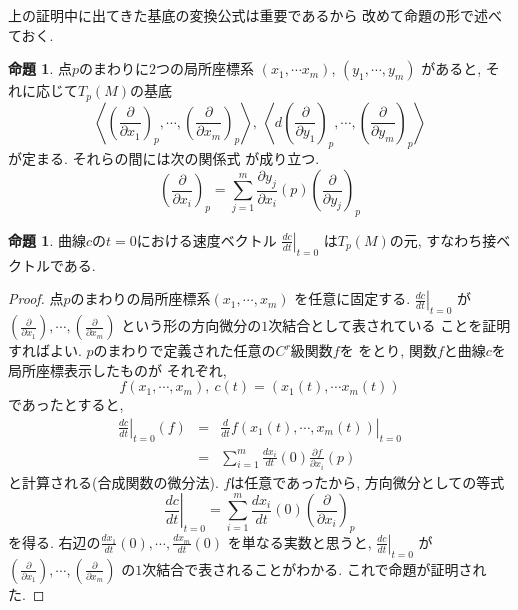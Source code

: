 \documentclass[a4j,12pt]{jarticle}
\theoremstyle{definition}
\newtheorem{proposition}[theorem]{命題}
\begin{document}
    上の証明中に出てきた基底の変換公式は重要であるから
    改めて命題の形で述べておく. 
    \begin{proposition}\label{prop:basis conversion}
        点$p$のまわりに$2$つの局所座標系
        $(x_1,\cdots x_m)$, $(y_1,\cdots ,y_m)$
        があると, それに応じて$T_p(M)$の基底
        $$\left<\left(\frac{\partial}
        {\partial x_1}\right)_p,\cdots ,
        \left(\frac{\partial}
        {\partial x_m}\right)_p\right>,\ 
        \left<d\left(\frac{\partial}
        {\partial y_1}\right)_p,\cdots ,
        \left(\frac{\partial}
        {\partial y_m}\right)_p\right>$$
        が定まる. それらの間には次の関係式
        が成り立つ. 
        $$\left(\frac{\partial}{\partial x_i}\right)_p=
        \sum_{j=1}^{m}
        \frac{\partial y_j}{\partial x_i}(p)
        \left(\frac{\partial}{\partial y_j}\right)_p$$
    \end{proposition}
    \begin{proposition}
        曲線$c$の$t=0$における速度ベクトル
        $\left .\frac{dc}{dt}\right|_{t=0}$
        は$T_p(M)$の元, すなわち接ベクトルである. 
    \end{proposition}
    \begin{proof}
        点$p$のまわりの局所座標系$(x_1,\cdots ,x_m)$
        を任意に固定する. 
        $\left .\frac{dc}{dt}\right|_{t=0}$
        が$\left(\frac{\partial}{\partial x_1}\right), 
        \cdots ,
        \left(\frac{\partial}{\partial x_m}\right)$
        という形の方向微分の$1$次結合として表されている
        ことを証明すればよい. 
        $p$のまわりで定義された任意の$C^r$級関数$f$を
        をとり, 関数$f$と曲線$c$を局所座標表示したものが
        それぞれ, 
        $$f(x_1,\cdots ,x_m),\ 
        c(t)=(x_1(t),\cdots x_m(t))$$
        であったとすると, 
        \begin{eqnarray*}
            \left .\frac{dc}{dt}\right|_{t=0}(f)&=&
            \left .\frac{d}{dt}f(x_1(t),\cdots ,x_m(t))
            \right|_{t=0}\\
            &=&\sum_{i=1}^{m}\frac{dx_i}{dt}(0)
            \frac{\partial f}{\partial x_i}(p)
        \end{eqnarray*}
        と計算される(合成関数の微分法). 
        $f$は任意であったから, 方向微分としての等式
        $$\left .\frac{dc}{dt}\right|_{t=0}=
        \sum_{i=1}^{m}\frac{dx_i}{dt}(0)
            \left(\frac{\partial}{\partial x_i}
            \right)_p$$
        を得る. 右辺の$\frac{dx_1}{dt}(0), 
        \cdots ,\frac{dx_m}{dt}(0)$
        を単なる実数と思うと, 
        $\left .\frac{dc}{dt}\right|_{t=0}$
        が
        $\left(\frac{\partial}{\partial x_1}\right), 
        \cdots ,
        \left(\frac{\partial}{\partial x_m}\right)$
        の$1$次結合で表されることがわかる. 
        これで命題が証明された. 
    \end{proof}
\end{document}
